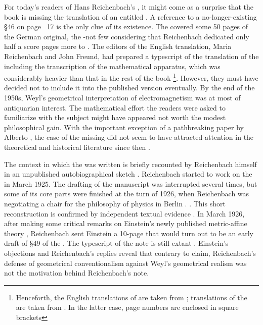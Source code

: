 \documentclass[submitted]{article}
\newcommand{\PRZL}{\citetitle{Reichenbach1928}\xspace}
\begin{document}
For today's readers of Hans Reichenbach's  \citep{Reichenbach1958}, it might come as a surprise that the book is missing the translation of an \Ap entitled . A reference to a no-longer-existing \S46 on page ~17 is the only clue of its existence. The \Ap covered some 50 pages of the German original, the \PRZL \citep{Reichenbach1928}-not few considering that Reichenbach dedicated only half a score pages more to \gr. The editors of the English translation, Maria Reichenbach and John Freund, had prepared a typescript of the translation of the \Ap \citep[041-2101]{HR} including the transcription of the mathematical apparatus, which was considerably heavier than that in the rest of the book \footnote{Henceforth, the English translations of \PRZL are taken from \cite{Reichenbach1958}; translations of the \Ap are taken from \cite[041-2101]{HR}. In the latter case, page numbers are enclosed in square brackets}. However, they must have decided not to include it into the published version eventually. By the end of the 1950s, Weyl's geometrical interpretation of electromagnetism was at most of antiquarian interest. The mathematical effort the readers were asked to familiarize with the subject might have appeared not worth the modest philosophical gain. With the important exception of a pathbreaking paper by Alberto \citet{Coffa1979}, the case of the missing \Ap did not seem to have attracted attention in the theoretical and historical literature since then .

The context in which the \Ap was written is briefly recounted by Reichenbach himself in an unpublished autobiographical sketch \citep[044-06-25]{HR}. Reichenbach started to work on the \PRZL in March 1925. The drafting of the manuscript was interrupted several times, but some of its core parts were finished at the turn of 1926, when Reichenbach was negotiating a chair for the philosophy of physics in Berlin \citep{Hecht1982}.  \citep[044-06-25]{HR}. This short reconstruction is confirmed by independent textual evidence . In March 1926, after making some critical remarks on Einstein's newly published metric-affine theory \citep{Einstein1925a}, Reichenbach sent Einstein a 10-page  that would turn out to be an early draft of \S49 of the \Ap. The typescript of the note is still extant \citep[025-05-10]{HR}. Einstein's objections and Reichenbach's replies reveal that contrary to  claim, Reichenbach's defense of geometrical conventionalism against Weyl's geometrical realism  was not the motivation behind Reichenbach's note.
\end{document}
